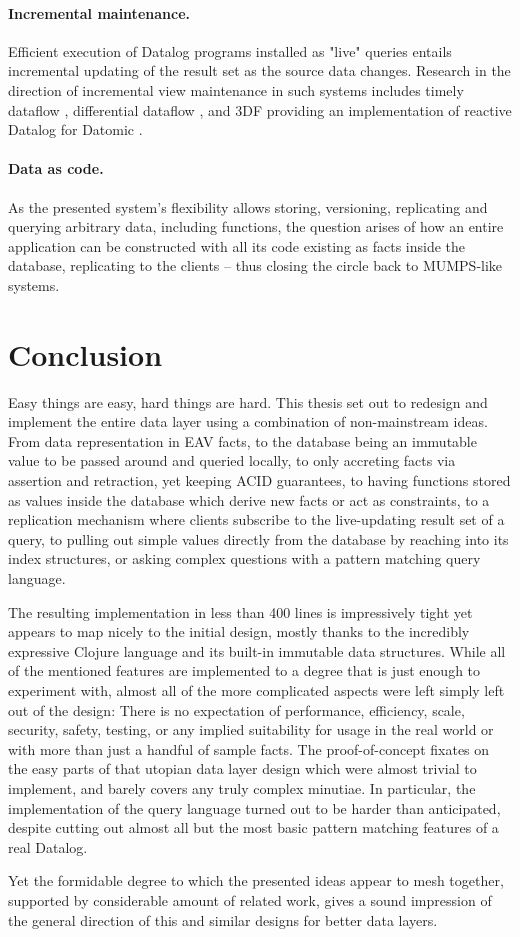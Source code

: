 \paragraph{Incremental maintenance.} Efficient execution of Datalog programs installed as "live" queries entails incremental updating of the result set as the source data changes.
Research in the direction of incremental view maintenance in such systems includes timely dataflow \cite{murray2013naiad}, differential dataflow \cite{mcsherry2013differential}, and 3DF providing an implementation of reactive Datalog for Datomic \cite{gobel2019optimising}.


\paragraph{Data as code.} As the presented system's flexibility allows storing, versioning, replicating and querying arbitrary data, including functions, the question arises of how an entire application can be constructed with all its code existing as facts inside the database, replicating to the clients -- thus closing the circle back to MUMPS-like systems.


\cleardoublepage
\section{Conclusion}

Easy things are easy, hard things are hard. This thesis set out to redesign and implement the entire data layer using a combination of non-mainstream ideas. From data representation in EAV facts, to the database being an immutable value to be passed around and queried locally, to only accreting facts via assertion and retraction, yet keeping ACID guarantees, to having functions stored as values inside the database which derive new facts or act as constraints, to a replication mechanism where clients subscribe to the live-updating result set of a query, to pulling out simple values directly from the database by reaching into its index structures, or asking complex questions with a pattern matching query language.

The resulting implementation in less than 400 lines is impressively tight yet appears to map nicely to the initial design, mostly thanks to the incredibly expressive Clojure language and its built-in immutable data structures. While all of the mentioned features are implemented to a degree that is just enough to experiment with, almost all of the more complicated aspects were left simply left out of the design: There is no expectation of performance, efficiency, scale, security, safety, testing, or any implied suitability for usage in the real world or with more than just a handful of sample facts. The proof-of-concept fixates on the easy parts of that utopian data layer design which were almost trivial to implement, and barely covers any truly complex minutiae. In particular, the implementation of the query language turned out to be harder than anticipated, despite cutting out almost all but the most basic pattern matching features of a real Datalog.

Yet the formidable degree to which the presented ideas appear to mesh together, supported by considerable amount of related work, gives a sound impression of the general direction of this and similar designs for better data layers.
